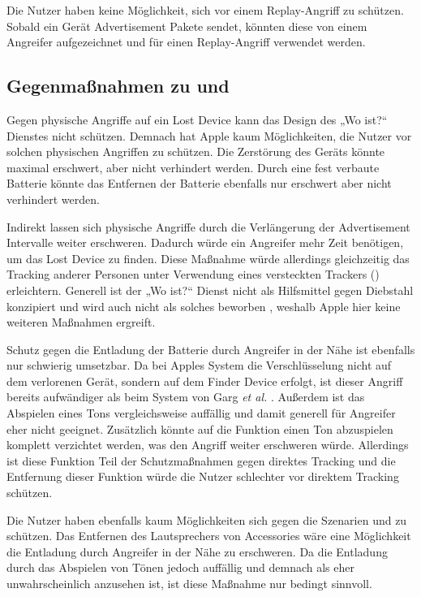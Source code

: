 Die Nutzer haben keine Möglichkeit, sich vor einem Replay-Angriff zu schützen.
Sobald ein Gerät Advertisement Pakete sendet, könnten diese von einem Angreifer aufgezeichnet und für einen Replay-Angriff verwendet werden.


\subsection{Gegenmaßnahmen zu  und }

Gegen physische Angriffe auf ein Lost Device kann das Design des „Wo ist?“ Dienstes nicht schützen.
Demnach hat Apple kaum Möglichkeiten, die Nutzer vor solchen physischen Angriffen zu schützen.
Die Zerstörung des Geräts könnte maximal erschwert, aber nicht verhindert werden.
Durch eine fest verbaute Batterie könnte das Entfernen der Batterie ebenfalls nur erschwert aber nicht verhindert werden.

Indirekt lassen sich physische Angriffe durch die Verlängerung der Advertisement Intervalle weiter erschweren.
Dadurch würde ein Angreifer mehr Zeit benötigen, um das Lost Device zu finden.
Diese Maßnahme würde allerdings gleichzeitig das Tracking anderer Personen unter Verwendung eines versteckten Trackers () erleichtern.
Generell ist der „Wo ist?“ Dienst nicht als Hilfsmittel gegen Diebstahl konzipiert und wird auch nicht als solches beworben \cite{Apple_WoIst}, weshalb Apple hier keine weiteren Maßnahmen ergreift.

Schutz gegen die Entladung der Batterie durch Angreifer in der Nähe ist ebenfalls nur schwierig umsetzbar.
Da bei Apples System die Verschlüsselung nicht auf dem verlorenen Gerät, sondern auf dem Finder Device erfolgt, ist dieser Angriff bereits aufwändiger als beim System von Garg \textit{et al.} \cite{Garg_Secure_Tracker}.
Außerdem ist das Abspielen eines Tons vergleichsweise auffällig und damit generell für Angreifer eher nicht geeignet.
Zusätzlich könnte auf die Funktion einen Ton abzuspielen komplett verzichtet werden, was den Angriff weiter erschweren würde.
Allerdings ist diese Funktion Teil der Schutzmaßnahmen gegen direktes Tracking und die Entfernung dieser Funktion würde die Nutzer schlechter vor direktem Tracking schützen.

Die Nutzer haben ebenfalls kaum Möglichkeiten sich gegen die Szenarien  und  zu schützen. 
Das Entfernen des Lautsprechers von Accessories wäre eine Möglichkeit die Entladung durch Angreifer in der Nähe zu erschweren.
Da die Entladung durch das Abspielen von Tönen jedoch auffällig und demnach als eher unwahrscheinlich anzusehen ist, ist diese Maßnahme nur bedingt sinnvoll.


